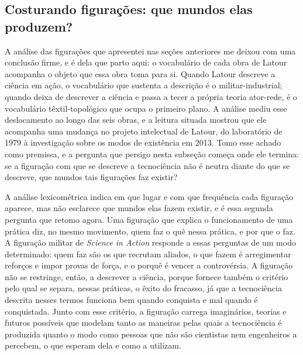 \subsection{Costurando figurações: que mundos elas produzem?}
\label{subsec:costurando_figuracoes}

A análise das figurações que apresentei nas seções anteriores me deixou com uma conclusão firme, e é dela que parto aqui: o vocabulário de cada obra de Latour acompanha o objeto que essa obra toma para si. Quando Latour descreve a ciência em ação, o vocabulário que sustenta a descrição é o militar-industrial; quando deixa de descrever a ciência e passa a tecer a própria teoria ator-rede, é o vocabulário têxtil-topológico que ocupa o primeiro plano. A análise mediu esse deslocamento ao longo das seis obras, e a leitura situada mostrou que ele acompanha uma mudança no projeto intelectual de Latour, do laboratório de 1979 à investigação sobre os modos de existência em 2013. Tomo esse achado como premissa, e a pergunta que persigo nesta subseção começa onde ele termina: se a figuração com que se descreve a tecnociência não é neutra diante do que se descreve, que mundos tais figurações faz existir?

A análise lexicométrica indica em que lugar e com que frequência cada figuração aparece, mas não esclarece que mundos elas fazem existir, e é essa segunda pergunta que retomo agora. Uma figuração que explica o funcionamento de uma prática diz, no mesmo movimento, quem faz o quê nessa prática, e por que o faz. A figuração militar de \emph{Science in Action} responde a essas perguntas de um modo determinado: quem faz são os que recrutam aliados, o que fazem é arregimentar reforços e impor provas de força, e o porquê é vencer a controvérsia. A figuração não se restringe, então, a descrever a ciência, porque fornece também o critério pelo qual se separa, nessas práticas, o êxito do fracasso, já que a tecnociência descrita nesses termos funciona bem quando conquista e mal quando é conquistada. Junto com esse critério, a figuração carrega imaginários, teorias e futuros possíveis que modelam tanto as maneiras pelas quais a tecnociência é produzida quanto o modo como pessoas que não são cientistas nem engenheiros a percebem, o que esperam dela e como a utilizam.

